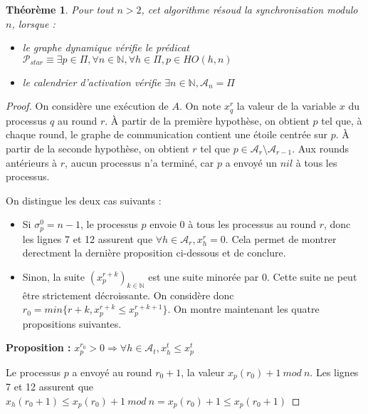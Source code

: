 \documentclass{article}
\newtheorem{theorem}{Théorème}
\begin{document}
\begin{theorem}

	Pour tout $n > 2$, cet algorithme résoud la synchronisation modulo $n$, lorsque  :
	\begin{itemize}

	\item le graphe dynamique vérifie le prédicat $\mathcal{P}_{star} \equiv \exists p \in \Pi, \forall n \in \mathds{N}, \forall h \in \Pi, p \in HO(h,n)$
	\item le calendrier d'activation vérifie $\exists n \in \mathds{N}, \mathcal{A}_n = \Pi$

	\end{itemize}
	

\end{theorem}
\begin{proof}

	On considère une exécution de $A$. On note $x_q^r$ la valeur de la variable $x$ du processus $q$ au round $r$.
	À partir de la première hypothèse, on obtient $p$ tel que, à chaque round, le graphe de communication contient une étoile centrée sur $p$.
	À partir de la seconde hypothèse, on obtient $r$ tel que $p \in \mathcal{A}_r \setminus \mathcal{A}_{r-1}$.
	Aux rounds antérieurs à $r$, aucun processus n'a terminé, car $p$ a envoyé un $nil$ à tous les processus.

	On distingue les deux cas suivants :
	\begin{itemize}

	\item Si $\sigma^0_p = n-1$, le processus $p$ envoie 0 à tous les processus au round $r$, donc les lignes 7 et 12 assurent que $\forall h \in \mathcal{A}_r, x_h^r = 0$.
		Cela permet de montrer derectment la dernière proposition ci-dessous et de conclure.
	\item Sinon, la suite $(x_p^{r+k})_{k \in \mathds{N}}$ est une suite minorée par 0.
		Cette suite ne peut être strictement décroissante. On considère donc $r_0 = min \{r+k, x^{r+k}_p \leq x_p^{r+k+1}\}$.
		On montre maintenant les quatre propositions suivantes.

	\end{itemize}

	\textbf{Proposition :} $x_p^{r_0} > 0 \Rightarrow \forall h \in \mathcal{A}_t, x_h^t \leq x_p^t$

	Le processus $p$ a envoyé au round $r_0+1$, la valeur $x_p(r_0)+1~mod~n$. 
	Les lignes 7 et 12 assurent que $x_h(r_0+1) \leq x_p(r_0)+1~mod~n = x_p(r_0)+1 \leq x_p(r_0+1)$


\end{proof}
\end{document}
